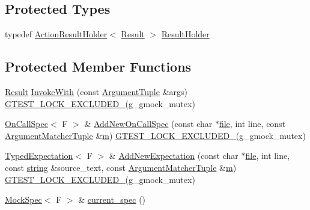 \subsection*{Protected Types}
\begin{DoxyCompactItemize}
\item 
typedef \hyperlink{classtesting_1_1internal_1_1_action_result_holder}{Action\+Result\+Holder}$<$ \hyperlink{classtesting_1_1internal_1_1_function_mocker_base_aa50abc4055b4d3a14ad64c317bccec8d}{Result} $>$ \hyperlink{classtesting_1_1internal_1_1_function_mocker_base_aa4e1b2ee217676c9e70c3006b19a8074}{Result\+Holder}
\end{DoxyCompactItemize}
\subsection*{Protected Member Functions}
\begin{DoxyCompactItemize}
\item 
\hyperlink{classtesting_1_1internal_1_1_function_mocker_base_aa50abc4055b4d3a14ad64c317bccec8d}{Result} \hyperlink{classtesting_1_1internal_1_1_function_mocker_base_a869ec713f000b4e7829c660efc25e8cd}{Invoke\+With} (const \hyperlink{classtesting_1_1internal_1_1_function_mocker_base_a336432a07e544af4ffb8103603471ca3}{Argument\+Tuple} \&args) \hyperlink{gtest-port_8h_a69abff5a4efdd07bd5faebe3dd318d06}{G\+T\+E\+S\+T\+\_\+\+L\+O\+C\+K\+\_\+\+E\+X\+C\+L\+U\+D\+E\+D\+\_\+}(g\+\_\+gmock\+\_\+mutex)
\item 
\hyperlink{classtesting_1_1internal_1_1_on_call_spec}{On\+Call\+Spec}$<$ F $>$ \& \hyperlink{classtesting_1_1internal_1_1_function_mocker_base_a22ece3b6e8d24f11d8f4ba9c17b737c4}{Add\+New\+On\+Call\+Spec} (const char $\ast$\hyperlink{_07copy_08_2_read_camera_model_8m_a151631b2fd2bb776ef06c9f440a7ed74}{file}, int line, const \hyperlink{classtesting_1_1internal_1_1_function_mocker_base_ab790bcb1dcf57fa6659365386723ae5a}{Argument\+Matcher\+Tuple} \&\hyperlink{variables__e_8js_aab4247b6acebcba996939b177f483c14}{m}) \hyperlink{gtest-port_8h_a69abff5a4efdd07bd5faebe3dd318d06}{G\+T\+E\+S\+T\+\_\+\+L\+O\+C\+K\+\_\+\+E\+X\+C\+L\+U\+D\+E\+D\+\_\+}(g\+\_\+gmock\+\_\+mutex)
\item 
\hyperlink{classtesting_1_1internal_1_1_typed_expectation}{Typed\+Expectation}$<$ F $>$ \& \hyperlink{classtesting_1_1internal_1_1_function_mocker_base_aa2c35c565f08d3649436af443ece468f}{Add\+New\+Expectation} (const char $\ast$\hyperlink{_07copy_08_2_read_camera_model_8m_a151631b2fd2bb776ef06c9f440a7ed74}{file}, int line, const \hyperlink{namespacetesting_1_1internal_a8e8ff5b11e64078831112677156cb111}{string} \&source\+\_\+text, const \hyperlink{classtesting_1_1internal_1_1_function_mocker_base_ab790bcb1dcf57fa6659365386723ae5a}{Argument\+Matcher\+Tuple} \&\hyperlink{variables__e_8js_aab4247b6acebcba996939b177f483c14}{m}) \hyperlink{gtest-port_8h_a69abff5a4efdd07bd5faebe3dd318d06}{G\+T\+E\+S\+T\+\_\+\+L\+O\+C\+K\+\_\+\+E\+X\+C\+L\+U\+D\+E\+D\+\_\+}(g\+\_\+gmock\+\_\+mutex)
\item 
\hyperlink{classtesting_1_1internal_1_1_mock_spec}{Mock\+Spec}$<$ F $>$ \& \hyperlink{classtesting_1_1internal_1_1_function_mocker_base_a744318106e20b346f4f1efbf5a601644}{current\+\_\+spec} ()
\end{DoxyCompactItemize}
